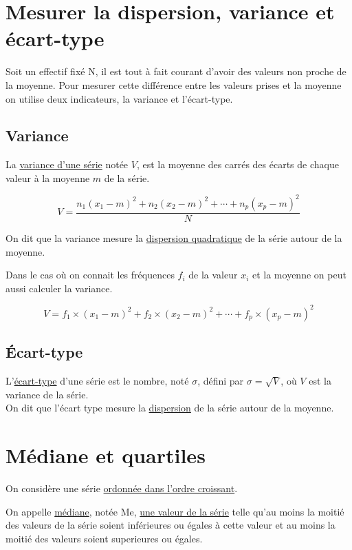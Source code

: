 \documentclass[french]{book}
\begin{document}
\section{Mesurer la dispersion, variance et écart-type}
Soit un effectif fixé N, il est tout à fait courant d'avoir des valeurs non proche de la moyenne. Pour mesurer cette différence entre les valeurs prises et la moyenne on utilise deux indicateurs, la variance et l'écart-type.

\subsection{Variance}
\begin{defn}
La \underline{variance d'une série} notée $V$, est la moyenne des carrés des écarts de chaque valeur à la moyenne $m$ de la série.

$$V=\frac{n_1(x_1-m)^2+n_2(x_2-m)^2+\cdots+n_p(x_p-m)^2}{N}$$

On dit que la variance mesure la \underline{dispersion quadratique} de la série autour de la moyenne.
\end{defn}
 
\begin{prop}
Dans le cas où on connait les fréquences $f_i$ de la valeur $x_i$ et la moyenne on peut aussi calculer la variance.

$$V=f_1 \times (x_1 - m)^2 +f_2 \times (x_2 - m)^2 +\cdots+ f_p \times (x_p - m)^2$$
\end{prop}

\subsection{Écart-type}

\begin{defn}
L'\underline{écart-type} d'une série est le nombre, noté $\sigma$, défini par $\sigma=\sqrt{V}$, où $V$ est la variance de la série.\\

On dit que l'écart type mesure la \underline{dispersion} de la série autour de la moyenne.
\end{defn}


\section{Médiane et quartiles}
On considère une série \underline{ordonnée  dans l'ordre croissant}.\\

\begin{defn}
On appelle \underline{médiane}, notée Me, \underline{une valeur de la série} telle qu'au moins la moitié des valeurs de la série soient inférieures ou égales à cette valeur et au moins la moitié des valeurs soient superieures ou égales.
\end{defn}
\end{document}
